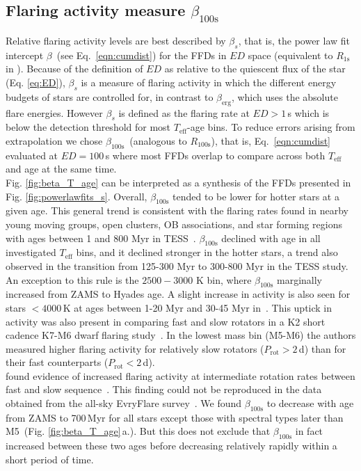 \documentclass{aa}
\begin{document}
\subsection{Flaring activity measure $\beta_\mathrm{100s}$}
\label{sec:beta100s}
Relative flaring activity levels are best described by $\beta_s$, that is, the power law fit intercept $\beta$~(see Eq.~\ref{eqn:cumdist}) for the FFDs in $ED$ space (equivalent to $R_\mathrm{1s}$ in \citealt{davenport2019}). Because of the definition of $ED$ as relative to the quiescent flux of the star (Eq. \ref{eq:ED}), $\beta_s$ is a measure of flaring activity in which the different energy budgets of stars are controlled for, in contrast to $\beta_\mathrm{erg}$, which uses the absolute flare energies. However $\beta_s$ is defined as the flaring rate at $ED>1$\,s which is below the detection threshold for most $T_\mathrm{eff}$-age bins. To reduce errors arising from extrapolation we chose $\beta_\mathrm{100s}$~(analogous to $R_\mathrm{100s}$), that is, Eq.~\ref{eqn:cumdist} evaluated at $ED=100\,$s where most FFDs overlap to compare across both $T_\mathrm{eff}$ and age at the same time.
\\
Fig. \ref{fig:beta_T_age} can be interpreted as a synthesis of the FFDs presented in Fig. \ref{fig:powerlawfits_s}. Overall, $\beta_\mathrm{100s}$ tended to be lower for hotter stars at a given age. This general trend is consistent with the flaring rates found in nearby young moving groups, open clusters, OB associations, and star forming regions with ages between 1 and 800 Myr in TESS~\citep{feinstein2020}. $\beta_\mathrm{100s}$ declined with age in all investigated $T_\mathrm{eff}$ bins, and it declined stronger in the hotter stars, a trend also observed in the transition from 125-300 Myr to 300-800 Myr in the TESS study. An exception to this rule is the $2500-3000$ K bin, where $\beta_\mathrm{100s}$ marginally increased from ZAMS to Hyades age. A slight increase in activity is also seen for stars $<4000\,$K at ages between 1-20 Myr and 30-45 Myr in~\cite{feinstein2020}. This uptick in activity was also present in comparing fast and slow rotators in a K2 short cadence K7-M6 dwarf flaring study~\citep{raetz2020}. In the lowest mass bin (M5-M6) the authors measured higher flaring activity for relatively slow rotators ($P_\mathrm{rot} > 2\,$d) than for their fast counterparts ($P_\mathrm{rot} < 2\,$d).  
\\
\citet{mondrik2019} found evidence of increased flaring activity at intermediate rotation rates between fast and slow sequence~\citep{barnes_rotational_2003}. This finding could not be reproduced in the data obtained from the all-sky EvryFlare survey~\citep{howard2020}. We found $\beta_\mathrm{100s}$ to decrease with age from ZAMS to 700\,Myr for all stars except those with spectral types later than M5~(Fig. \ref{fig:beta_T_age}\,a.). But this does not exclude that $\beta_\mathrm{100s}$ in fact increased between these two ages before decreasing relatively rapidly within a short period of time.
\end{document}
